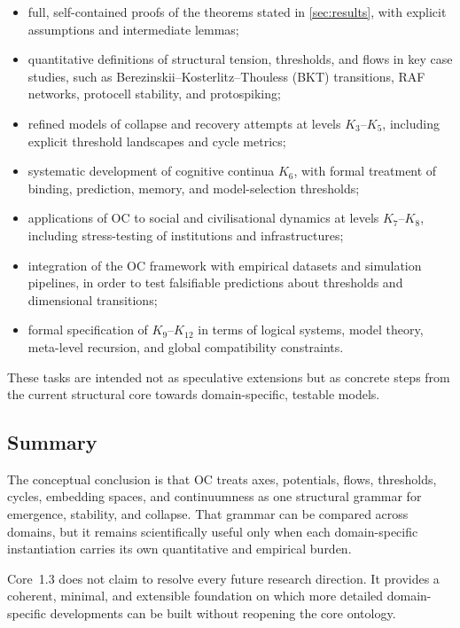 \begin{itemize}
    \item full, self-contained proofs of the theorems stated in \cref{sec:results}, with explicit assumptions and intermediate lemmas;
    \item quantitative definitions of structural tension, thresholds, and flows in key case studies, such as Berezinskii--Kosterlitz--Thouless (BKT) transitions, RAF networks, protocell stability, and protospiking;
    \item refined models of collapse and recovery attempts at levels \(K_3\)--\(K_5\), including explicit threshold landscapes and cycle metrics;
    \item systematic development of cognitive continua \(K_6\), with formal treatment of binding, prediction, memory, and model-selection thresholds;
    \item applications of OC to social and civilisational dynamics at levels \(K_7\)--\(K_{8}\), including stress-testing of institutions and infrastructures;
    \item integration of the OC framework with empirical datasets and simulation pipelines, in order to test falsifiable predictions about thresholds and dimensional transitions;
    \item formal specification of \(K_9\)--\(K_{12}\) in terms of logical systems, model theory, meta-level recursion, and global compatibility constraints.
\end{itemize}

These tasks are intended not as speculative extensions but as concrete steps from the current structural core towards domain-specific, testable models.

\subsection{Summary}

The conceptual conclusion is that OC treats axes, potentials, flows,
thresholds, cycles, embedding spaces, and continuumness as one structural
grammar for emergence, stability, and collapse. That grammar can be compared
across domains, but it remains scientifically useful only when each
domain-specific instantiation carries its own quantitative and empirical burden.

Core~1.3 does not claim to resolve every future research direction. It provides a
coherent, minimal, and extensible foundation on which more detailed
domain-specific developments can be built without reopening the core ontology.
